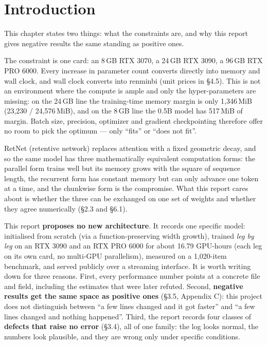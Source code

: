 %

\section{Introduction}

This chapter states two things: what the constraints are, and why this report gives negative
results the same standing as positive ones.

The constraint is one card: an 8\,GB RTX 3070, a 24\,GB RTX 3090, a 96\,GB RTX PRO 6000. Every
increase in parameter count converts directly into memory and wall clock, and wall clock converts
into renminbi (unit prices in \S4.5). This is not an environment where the compute is ample and
only the hyper-parameters are missing: on the 24\,GB line the training-time memory margin is only
1{,}346\,MiB (23{,}230 / 24{,}576\,MiB), and on the 8\,GB line the 0.5B model has 517\,MiB of
margin. Batch size, precision, optimizer and gradient checkpointing therefore offer no room to
pick the optimum --- only ``fits'' or ``does not fit''.

RetNet (retentive network) replaces attention with a fixed geometric decay, and so the same model
has three mathematically equivalent computation forms: the parallel form trains well but its
memory grows with the square of sequence length, the recurrent form has constant memory but can
only advance one token at a time, and the chunkwise form is the compromise. What this report
cares about is whether the three can be exchanged on one set of weights and whether they agree
numerically (\S2.3 and \S6.1).

This report \textbf{proposes no new architecture}. It records one specific model: initialised
from scratch (via a function-preserving width growth), trained \emph{leg by leg} on an RTX 3090
and an RTX PRO 6000 for about 16.79 GPU-hours (each leg on its own card, no multi-GPU
parallelism), measured on a 1{,}020-item benchmark, and served publicly over a streaming
interface. It is worth writing down for three reasons. First, every performance number points at
a concrete file and field, including the estimates that were later refuted. Second,
\textbf{negative results get the same space as positive ones} (\S3.5, Appendix C): this project
does not distinguish between ``a few lines changed and it got faster'' and ``a few lines changed
and nothing happened''. Third, the report records four classes of \textbf{defects that raise no
error} (\S3.4), all of one family: the log looks normal, the numbers look plausible, and they are
wrong only under specific conditions.

